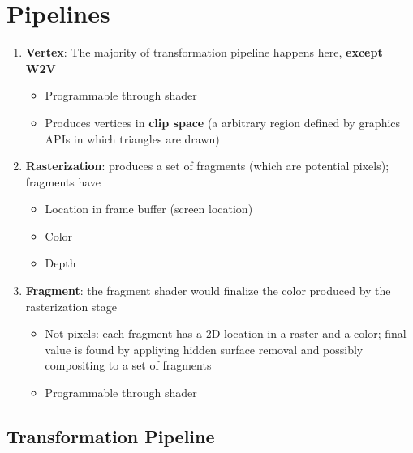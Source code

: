 \chapter{Pipelines}\label{chapter: pipelines}

\begin{enumerate}
  \item \textbf{Vertex}: The majority of transformation pipeline happens here,
  \textbf{except W2V}
  \begin{itemize}
    \item Programmable through shader
    \item Produces vertices in \textbf{clip space} (a arbitrary region defined
    by graphics APIs in which triangles are drawn)
  \end{itemize}

  \item \textbf{Rasterization}: produces a set of fragments (which are
  potential pixels); fragments have
  \begin{itemize}
    \item Location in frame buffer (screen location)
    \item Color
    \item Depth
  \end{itemize}

  \item \textbf{Fragment}: the fragment shader would finalize the color
  produced by the rasterization stage
  \begin{itemize}
    \item Not pixels: each fragment has a 2D location in a raster and a color;
    final value is found by appliying hidden surface removal and possibly
    compositing to a set of fragments
    \item Programmable through shader
  \end{itemize}
\end{enumerate}

\section{Transformation Pipeline}

